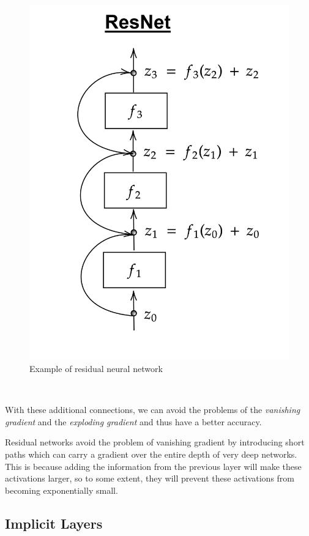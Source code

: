 \documentclass[10pt,a4paper]{article}
\theoremstyle{definition}
\theoremstyle{plain}
\begin{document}
\begin{figure}
\center
\includegraphics[scale=0.18]{resnet.png}
\caption{Example of residual neural network}
\label{exampleresnet}
\end{figure}

~

With these additional connections, we can avoid the problems of the \textit{vanishing gradient} and the \textit{exploding gradient} and thus have a better accuracy. 



Residual networks avoid the problem of vanishing gradient by introducing short paths which can carry a gradient over the entire depth of very deep networks. This is because adding the information from the previous layer will make these activations larger, so to some extent, they will prevent these activations from becoming exponentially small.


\subsection{Implicit Layers}
\end{document}
